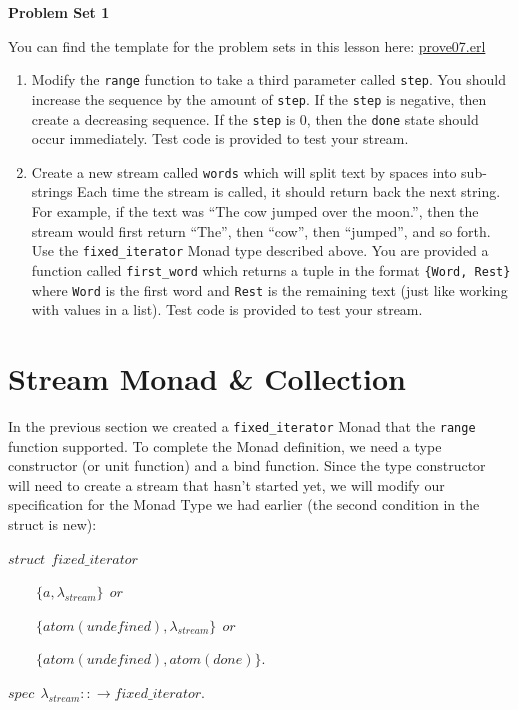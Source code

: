 \documentclass[
]{book}
\providecommand{\tightlist}{%
  \setlength{\itemsep}{0pt}\setlength{\parskip}{0pt}}
\begin{document}
\begin{problembox}

\textbf{Problem Set 1}

You can find the template for the problem sets in this lesson here: \href{proves/prove07.erl}{prove07.erl}

\begin{enumerate}
\def\labelenumi{\arabic{enumi}.}
\tightlist
\item
  Modify the \texttt{range} function to take a third parameter called \texttt{step}. You should increase the sequence by the amount of \texttt{step}. If the \texttt{step} is negative, then create a decreasing sequence. If the \texttt{step} is 0, then the \texttt{done} state should occur immediately. Test code is provided to test your stream.
\item
  Create a new stream called \texttt{words} which will split text by spaces into sub-strings Each time the stream is called, it should return back the next string. For example, if the text was ``The cow jumped over the moon.'', then the stream would first return ``The'', then ``cow'', then ``jumped'', and so forth. Use the \texttt{fixed\_iterator} Monad type described above. You are provided a function called \texttt{first\_word} which returns a tuple in the format \texttt{\{Word,\ Rest\}} where \texttt{Word} is the first word and \texttt{Rest} is the remaining text (just like working with values in a list). Test code is provided to test your stream.
\end{enumerate}

\end{problembox}

\hypertarget{stream-monad-collection}{%
\section{Stream Monad \& Collection}\label{stream-monad-collection}}

In the previous section we created a \texttt{fixed\_iterator} Monad that the \texttt{range} function supported. To complete the Monad definition, we need a type constructor (or unit function) and a bind function. Since the type constructor will need to create a stream that hasn't started yet, we will modify our specification for the Monad Type we had earlier (the second condition in the struct is new):

\begin{formulabox}
\(struct ~ ~ \mathit{f}ixed\_iterator\)

\(\quad \quad \lbrace a, \lambda_{stream} \rbrace ~ ~ or\)

\(\quad \quad \lbrace atom(unde\mathit{f}ined), \lambda_{stream} \rbrace ~ ~ or\)

\(\quad \quad \lbrace atom(unde\mathit{f}ined), atom(done) \rbrace.\)

\(spec ~ ~ \lambda_{stream} :: \rightarrow \mathit{f}ixed\_iterator.\)

\end{formulabox}
\end{document}
